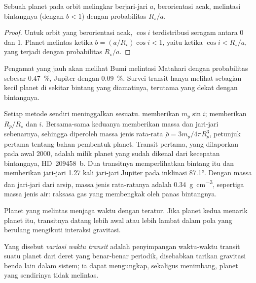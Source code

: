 \begin{proposition}\label{prop:b3:exoplanets:probability}
Sebuah planet pada orbit melingkar berjari-jari $a$, berorientasi acak, melintasi
bintangnya (dengan $b < 1$) dengan probabilitas $R_\star/a$.
\end{proposition}

\begin{proof}
Untuk orbit yang berorientasi acak, $\cos i$ terdistribusi seragam antara
0 dan 1. Planet melintas ketika $b = (a/R_\star)\cos i < 1$, yaitu
ketika $\cos i < R_\star/a$, yang terjadi dengan probabilitas $R_\star/a$.
\end{proof}

Pengamat yang jauh akan melihat Bumi melintasi Matahari dengan probabilitas
sebesar \qty{0.47}{\percent}, Jupiter dengan \qty{0.09}{\percent}. Survei
transit hanya melihat sebagian kecil planet di sekitar bintang yang
diamatinya, terutama yang dekat dengan bintangnya.

Setiap metode sendiri meninggalkan sesuatu.  memberikan
$m_p\sin i$;  memberikan $R_p/R_\star$ dan $i$. Bersama-sama keduanya memberikan
massa dan jari-jari sebenarnya, sehingga diperoleh massa jenis rata-rata
$\bar\rho = 3m_p/4\pi R_p^3$, petunjuk pertama tentang bahan pembentuk planet.
Transit pertama, yang dilaporkan pada awal 2000, adalah milik planet
yang sudah dikenal dari kecepatan bintangnya, HD~209458~b. Dua transitnya
memperlihatkan  bintang itu dan memberikan jari-jari 1.27 kali jari-jari Jupiter pada inklinasi
\ang{87.1}. Dengan massa dan jari-jari dari arsip, massa jenis rata-ratanya adalah
\qty{0.34}{g.cm^{-3}}, sepertiga massa jenis air: raksasa gas yang
membengkak oleh panas bintangnya.

Planet yang melintas menjaga waktu dengan teratur. Jika planet kedua menarik planet itu, transitnya
datang lebih awal atau lebih lambat dalam pola
yang berulang mengikuti interaksi gravitasi.

\begin{definition}\label{def:b3:exoplanets:ttv}
Yang disebut \emph{variasi waktu transit} adalah
penyimpangan waktu-waktu transit suatu planet dari
deret yang benar-benar periodik, disebabkan tarikan gravitasi benda lain dalam
sistem; ia dapat mengungkap, sekaligus menimbang, planet yang sendirinya tidak
melintas.
\end{definition}

